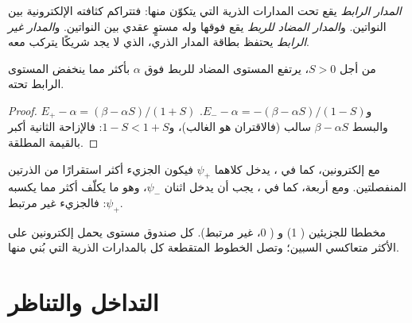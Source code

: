\begin{definition}\label{def:b2:diatomic-mos:bonding}
\emph{المدار الرابط} يقع تحت المدارات الذرية التي
يتكوّن منها: فتتراكم كثافته الإلكترونية بين النواتين. و\emph{المدار
المضاد للربط} يقع فوقها وله
مستوٍ عقدي بين النواتين. و\emph{المدار غير الرابط}
يحتفظ بطاقة المدار الذري، الذي لا يجد شريكًا
يتركب معه.
\end{definition}

\begin{proposition}\label{prop:b2:diatomic-mos:asymmetry}
من أجل $S > 0$، يرتفع المستوى المضاد للربط فوق $\alpha$ بأكثر مما
ينخفض المستوى الرابط تحته.
\end{proposition}

\begin{proof}
$E_+ - \alpha = (\beta - \alpha S)/(1 + S)$ و$E_- - \alpha = -(\beta - \alpha S)/(1 - S)$.
والبسط $\beta - \alpha S$ سالب (فالاقتران هو الغالب)، و$1 - S < 1
+ S$: فالإزاحة الثانية أكبر بالقيمة المطلقة.
\end{proof}

مع إلكترونين، كما في ، يدخل كلاهما $\psi_+$ فيكون الجزيء أكثر
استقرارًا من الذرتين المنفصلتين. ومع أربعة، كما في ، يجب أن يدخل اثنان $\psi_-$،
وهو ما يكلّف أكثر مما يكسبه $\psi_+$: فالجزيء  غير مرتبط.

\begin{omfigure}
\begin{MOdiagram}
\end{MOdiagram}
\hspace{1.5cm}
\begin{MOdiagram}
\end{MOdiagram}

{\small مخططا  للجزيئين  ( 1) و ( 0، غير مرتبط). كل صندوق مستوى يحمل إلكترونين على الأكثر
متعاكسي السبين؛ وتصل الخطوط المتقطعة كل  بالمدارات الذرية
التي بُني منها.}
\end{omfigure}

\section{التداخل والتناظر}


